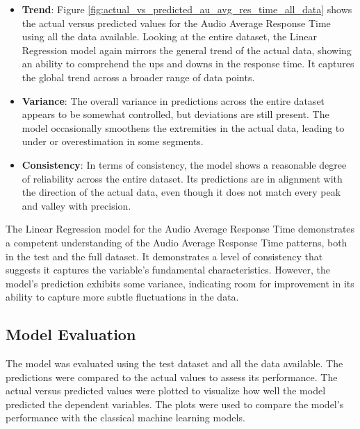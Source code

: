\begin{itemize}
    \item \textbf{Trend}: Figure \ref{fig:actual_vs_predicted_au_avg_res_time_all_data} shows the actual versus predicted values for the Audio Average Response Time using all the data available. Looking
          at the entire dataset, the Linear Regression model again mirrors the general trend of the actual data, showing an ability to comprehend the ups and downs in the response time. It captures the global trend across a
          broader range of data points.

    \item \textbf{Variance}: The overall variance in predictions across the entire dataset appears to be somewhat controlled, but deviations are still present. The model occasionally smoothens the extremities
          in the actual data, leading to under or overestimation in some segments.

    \item \textbf{Consistency}: In terms of consistency, the model shows a reasonable degree of reliability across the entire dataset. Its predictions are in alignment with the direction of the actual data,
          even though it does not match every peak and valley with precision.

\end{itemize}


The Linear Regression model for the Audio Average Response Time demonstrates a competent understanding of the Audio Average Response Time patterns, both in the test and the full dataset. It demonstrates
a level of consistency that suggests it captures the variable's fundamental characteristics. However, the model's prediction exhibits some variance, indicating room for improvement in its ability to capture more
subtle fluctuations in the data.



\subsection*{Model Evaluation}

The model was evaluated using the test dataset and all the data available. The predictions were compared to the actual values to assess its performance.
The actual versus predicted values were plotted to visualize how well the model predicted the dependent variables. The plots were used to compare the model's performance with the
classical machine learning models.

